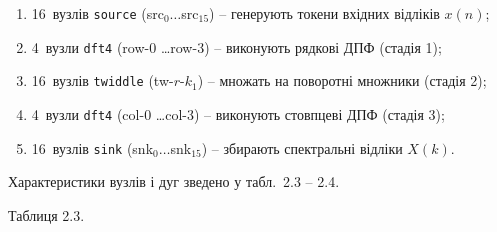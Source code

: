 \documentclass[
]{article}
\begin{document}
\begin{enumerate}
\def\labelenumi{\arabic{enumi}.}
\item
  16~вузлів \texttt{source} (src\(_{0}\ldots\)src\(_{15}\)) -- генерують
  токени вхідних відліків \(x(n)\);
\item
  4~вузли \texttt{dft4} (row-0 \ldots row-3) -- виконують рядкові ДПФ
  (стадія 1);
\item
  16~вузлів \texttt{twiddle} (tw-\(r\)-\(k_{1}\)) -- множать на
  поворотні множники (стадія 2);
\item
  4~вузли \texttt{dft4} (col-0 \ldots col-3) -- виконують стовпцеві ДПФ
  (стадія 3);
\item
  16~вузлів \texttt{sink} (snk\(_{0}\ldots\)snk\(_{15}\)) -- збирають
  спектральні відліки \(X(k)\).
\end{enumerate}

Характеристики вузлів і дуг зведено у табл.~2.3 -- 2.4.

Таблиця 2.3.
\end{document}
